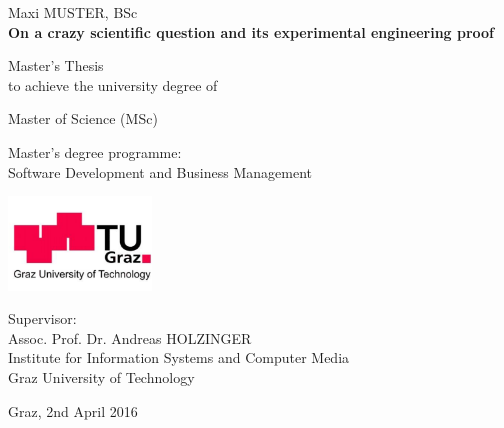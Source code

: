 
\begin{center}

{\large Maxi MUSTER, BSc} \\
\vspace{1cm}
{\LARGE \textbf
{
On a crazy scientific question and its experimental engineering proof\\
}
}
\vspace{3cm}

{\larger
Master's Thesis \\[1ex]
to achieve the university degree of

Master of Science (MSc)

Master's degree programme:\\ 
Software Development and Business Management

}



\end{center}

\vspace{2cm}

\begin{center}
\includegraphics[height=2.5cm]{images/tuglogo}

\vspace{2cm} %

{
Supervisor:\\
Assoc. Prof. Dr. Andreas HOLZINGER\\

Institute for Information Systems and Computer Media\\
Graz University of Technology


}
\vspace{1cm}

{
Graz, 2nd April 2016 \\
}

\end{center}





